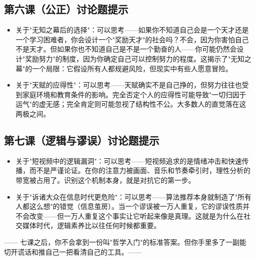 \documentclass[a4paper,12pt]{ctexart}
\begin{document}
\subsection*{第六课（公正）讨论题提示}
\begin{itemize}
  \item 关于"无知之幕后的选择"：可以思考——如果你不知道自己会是一个天才还是一个学习困难者，你会设计一个"奖励天才"的社会吗？不会，因为你害怕自己不是天才。但如果你也不知道自己是不是一个勤奋的人——你可能仍然会设计"奖励努力"的制度，因为你确定自己可以控制努力的程度。这揭示了"无知之幕"的一个局限：它假设所有人都规避风险，但现实中有些人愿意冒险。
  \item 关于"天赋的应得性"：可以思考——天赋确实不是自己挣的，但努力往往也受到家庭环境和教育条件的影响。完全否定个人的应得性可能导致"一切归因于运气"的虚无感；完全肯定则可能忽视了结构性不公。大多数人的直觉落在这两极之间。
\end{itemize}

\subsection*{第七课（逻辑与谬误）讨论题提示}
\begin{itemize}
  \item 关于"短视频中的逻辑漏洞"：可以思考——短视频追求的是情绪冲击和快速传播，而不是严谨论证。在你的注意力被画面、音乐和节奏牵引时，理性分析的带宽被占用了。识别这个机制本身，就是对抗它的第一步。
  \item 关于"诉诸大众在信息时代更危险"：可以思考——算法推荐本身就制造了"所有人都这么想"的错觉（信息茧房）。当一个谬误被一万人重复，它的谬误性质并不会改变——但一万人重复这个事实让它听起来像是真理。这就是为什么在社交媒体时代，逻辑素养比以往任何时候都重要。
\end{itemize}

\vspace{0.5cm}
\begin{center}
\textcolor{blue!70!black}{\large —— 七课之后，你不会拿到一份叫"哲学入门"的标准答案。但你手里多了一副能切开谎话和推自己一把看清自己的工具。——}
\end{center}
\end{document}
